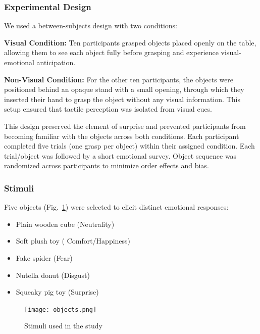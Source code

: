 \documentclass[conference]{IEEEtran}
\begin{document}
\subsubsection{Experimental Design}
We used a between-subjects design with two conditions:

    \textbf{Visual Condition:} Ten participants grasped objects placed openly on the table, allowing them to see each object fully before grasping and experience visual-emotional anticipation.
    
    \textbf{Non-Visual Condition: }For the other ten participants, the objects were positioned behind an opaque stand with a small opening, through which they inserted their hand to grasp the object without any visual information. This setup ensured that tactile perception was isolated from visual cues.

This design preserved the element of surprise and prevented participants from becoming familiar with the objects across both conditions. Each participant completed five trials (one grasp per object) within their assigned condition. Each trial/object was followed by a short emotional survey. Object sequence was randomized across participants to minimize order effects and bias.

\subsubsection{Stimuli}

Five objects (Fig.~\ref{fig:objects}) were selected to elicit distinct emotional responses:

\begin{itemize}
    \item Plain wooden cube (Neutrality)

    \item Soft plush toy ( Comfort/Happiness)

    \item Fake spider (Fear)

    \item Nutella donut (Disgust)

    \item Squeaky pig toy (Surprise)
\end{itemize}

\begin{figure}[H]
    \centering
    \texttt{[image: objects.png]}
    \caption{Stimuli used in the study}
    \label{fig:objects}
\end{figure}
\end{document}
